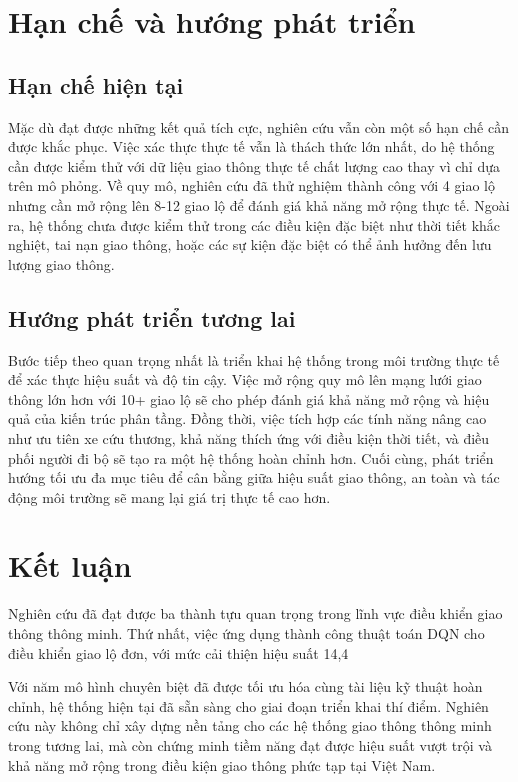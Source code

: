 \section{Hạn chế và hướng phát triển}

\subsection{Hạn chế hiện tại}
Mặc dù đạt được những kết quả tích cực, nghiên cứu vẫn còn một số hạn chế cần được khắc phục. Việc xác thực thực tế vẫn là thách thức lớn nhất, do hệ thống cần được kiểm thử với dữ liệu giao thông thực tế chất lượng cao thay vì chỉ dựa trên mô phỏng. Về quy mô, nghiên cứu đã thử nghiệm thành công với 4 giao lộ nhưng cần mở rộng lên 8-12 giao lộ để đánh giá khả năng mở rộng thực tế. Ngoài ra, hệ thống chưa được kiểm thử trong các điều kiện đặc biệt như thời tiết khắc nghiệt, tai nạn giao thông, hoặc các sự kiện đặc biệt có thể ảnh hưởng đến lưu lượng giao thông.

\subsection{Hướng phát triển tương lai}
Bước tiếp theo quan trọng nhất là triển khai hệ thống trong môi trường thực tế để xác thực hiệu suất và độ tin cậy. Việc mở rộng quy mô lên mạng lưới giao thông lớn hơn với 10+ giao lộ sẽ cho phép đánh giá khả năng mở rộng và hiệu quả của kiến trúc phân tầng. Đồng thời, việc tích hợp các tính năng nâng cao như ưu tiên xe cứu thương, khả năng thích ứng với điều kiện thời tiết, và điều phối người đi bộ sẽ tạo ra một hệ thống hoàn chỉnh hơn. Cuối cùng, phát triển hướng tối ưu đa mục tiêu để cân bằng giữa hiệu suất giao thông, an toàn và tác động môi trường sẽ mang lại giá trị thực tế cao hơn.

\section{Kết luận}

Nghiên cứu đã đạt được ba thành tựu quan trọng trong lĩnh vực điều khiển giao thông thông minh. Thứ nhất, việc ứng dụng thành công thuật toán DQN cho điều khiển giao lộ đơn, với mức cải thiện hiệu suất 14,4%

Với năm mô hình chuyên biệt đã được tối ưu hóa cùng tài liệu kỹ thuật hoàn chỉnh, hệ thống hiện tại đã sẵn sàng cho giai đoạn triển khai thí điểm. Nghiên cứu này không chỉ xây dựng nền tảng cho các hệ thống giao thông thông minh trong tương lai, mà còn chứng minh tiềm năng đạt được hiệu suất vượt trội và khả năng mở rộng trong điều kiện giao thông phức tạp tại Việt Nam.
